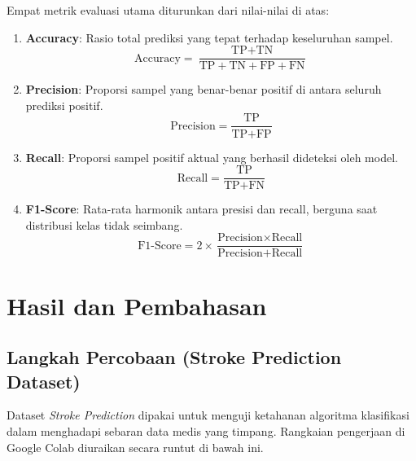 \documentclass[a4paper,oneside,12pt]{report}
\begin{document}
Empat metrik evaluasi utama diturunkan dari nilai-nilai di atas:
\begin{enumerate}
    \item \textbf{Accuracy}: Rasio total prediksi yang tepat terhadap keseluruhan sampel.
    \begin{equation}
        \text{Accuracy} = \frac{\text{TP} + \text{TN}}{\text{TP} + \text{TN} + \text{FP} + \text{FN}}
    \end{equation}
    
    \item \textbf{Precision}: Proporsi sampel yang benar-benar positif di antara seluruh prediksi positif.
    \begin{equation}
        \text{Precision} = \frac{\text{TP}}{\text{TP} + \text{FP}}
    \end{equation}
    
    \item \textbf{Recall}: Proporsi sampel positif aktual yang berhasil dideteksi oleh model.
    \begin{equation}
        \text{Recall} = \frac{\text{TP}}{\text{TP} + \text{FN}}
    \end{equation}
    
    \item \textbf{F1-Score}: Rata-rata harmonik antara presisi dan recall, berguna saat distribusi kelas tidak seimbang.
    \begin{equation}
        \text{F1-Score} = 2 \times \frac{\text{Precision} \times \text{Recall}}{\text{Precision} + \text{Recall}}
    \end{equation}
\end{enumerate}
\clearpage

\chapter{Hasil dan Pembahasan}

\section{Langkah Percobaan (Stroke Prediction Dataset)}
Dataset \textit{Stroke Prediction} dipakai untuk menguji ketahanan algoritma klasifikasi dalam menghadapi sebaran data medis yang timpang. Rangkaian pengerjaan di Google Colab diuraikan secara runtut di bawah ini.
\end{document}
